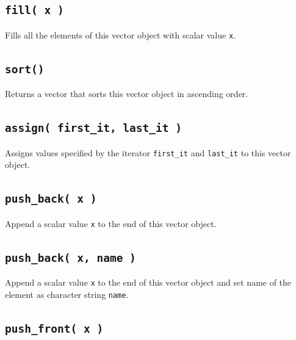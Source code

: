 \documentclass[]{book}
\begin{document}
\hypertarget{fill-x}{%
\subsection{\texorpdfstring{\texttt{fill(\ x\ )}}{fill( x )}}\label{fill-x}}

Fills all the elements of this vector object with scalar value \texttt{x}.

\hypertarget{sort}{%
\subsection{\texorpdfstring{\texttt{sort()}}{sort()}}\label{sort}}

Returns a vector that sorts this vector object in ascending order.

\hypertarget{assign-first_it-last_it}{%
\subsection{\texorpdfstring{\texttt{assign(\ first\_it,\ last\_it\ )}}{assign( first\_it, last\_it )}}\label{assign-first_it-last_it}}

Assigns values specified by the iterator \texttt{first\_it} and \texttt{last\_it} to this vector object.

\hypertarget{push_back-x}{%
\subsection{\texorpdfstring{\texttt{push\_back(\ x\ )}}{push\_back( x )}}\label{push_back-x}}

Append a scalar value \texttt{x} to the end of this vector object.

\hypertarget{push_back-x-name}{%
\subsection{\texorpdfstring{\texttt{push\_back(\ x,\ name\ )}}{push\_back( x, name )}}\label{push_back-x-name}}

Append a scalar value \texttt{x} to the end of this vector object and set name of the element as character string \texttt{name}.

\hypertarget{push_front-x}{%
\subsection{\texorpdfstring{\texttt{push\_front(\ x\ )}}{push\_front( x )}}\label{push_front-x}}
\end{document}
